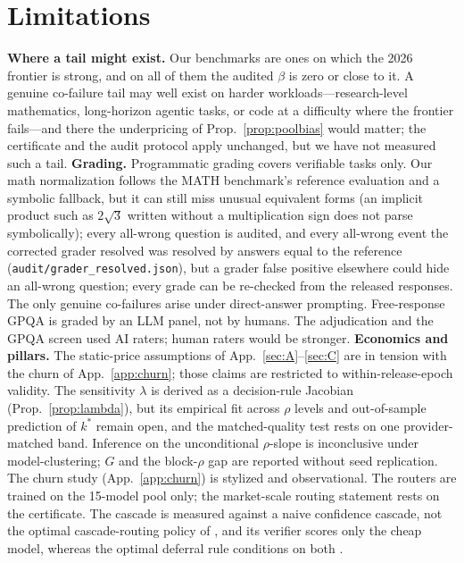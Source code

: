 \documentclass[11pt]{article}
\theoremstyle{plain}
\theoremstyle{definition}
\begin{document}
\section{Limitations}\label{sec:limits}
\textbf{Where a tail might exist.} Our benchmarks are ones on which the 2026 frontier is strong, and on all of them the audited
$\beta$ is zero or close to it. A genuine co-failure tail may well exist on harder workloads---research-level mathematics,
long-horizon agentic tasks, or code at a difficulty where the frontier fails---and there the underpricing of
Prop.~\ref{prop:poolbias} would matter; the certificate and the audit protocol apply unchanged, but we have not measured such a
tail.
\textbf{Grading.} Programmatic grading covers verifiable tasks only. Our math normalization follows the MATH benchmark's reference
evaluation and a symbolic fallback, but it can still miss unusual equivalent forms (an implicit product such as $2\sqrt3$ written
without a multiplication sign does not parse symbolically); every all-wrong question is audited, and every all-wrong event the corrected grader resolved was resolved by
answers equal to the reference (\texttt{audit/grader\_resolved.json}), but a grader false positive elsewhere could hide an all-wrong
question; every grade can be re-checked from the released responses. The only genuine co-failures arise under direct-answer
prompting. Free-response GPQA is graded by an LLM panel, not by humans. The
adjudication and the GPQA screen used AI raters; human raters would be stronger.
\textbf{Economics and pillars.} The static-price assumptions of App.~\ref{sec:A}--\ref{sec:C} are in tension with the churn of
App.~\ref{app:churn}; those claims are restricted to within-release-epoch validity. The sensitivity $\lambda$ is derived as a
decision-rule Jacobian (Prop.~\ref{prop:lambda}), but its empirical fit across $\rho$ levels and out-of-sample prediction of
$k^\ast$ remain open, and the matched-quality test rests on one provider-matched band. Inference on the unconditional
$\rho$-slope is inconclusive under model-clustering; $G$ and the block-$\rho$ gap are reported without seed replication. The churn
study (App.~\ref{app:churn}) is stylized and observational. The routers are trained on the 15-model pool only; the
market-scale routing statement rests on the certificate. The cascade is measured against a naive confidence cascade, not the
optimal cascade-routing policy of \citet{dekoninck2024cascaderouting}, and its verifier scores only the cheap model, whereas the
optimal deferral rule conditions on both \citep{jitkrittum2023cascade}.
\end{document}
